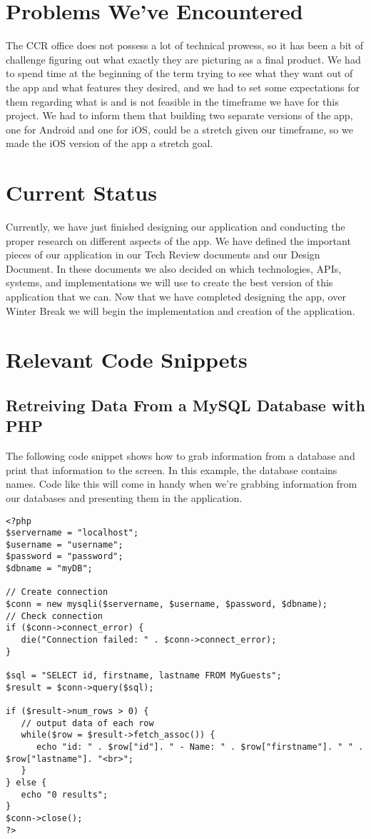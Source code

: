 \documentclass[draftclsnofoot, onecolumn, 10pt, compsoc]{IEEEtran}
\begin{document}
   \section{Problems We've Encountered}
   The CCR office does not possess a lot of technical prowess, so it has been a bit of challenge figuring out what exactly they are picturing as a final product. We had to spend time at the beginning of the term trying to see what they want out of the app and what features they desired, and we had to set some expectations for them regarding what is and is not feasible in the timeframe we have for this project. We had to inform them that building two separate versions of the app, one for Android and one for iOS, could be a stretch given our timeframe, so we made the iOS version of the app a stretch goal.

   \section{Current Status}
   Currently, we have just finished designing our application and conducting the proper research on different aspects of the app. We have defined the important pieces of our application in our Tech Review documents and our Design Document. In these documents we also decided on which technologies, APIs, systems, and implementations we will use to create the best version of this application that we can. Now that we have completed designing the app, over Winter Break we will begin the implementation and creation of the application.

   \section{Relevant Code Snippets}
      \subsection{Retreiving Data From a MySQL Database with PHP}
      The following code snippet shows how to grab information from a database and print that information to the screen. In this example, the database contains names. Code like this will come in handy when we're grabbing information from our databases and presenting them in the application.
      \begin{lstlisting}[style=php]
<?php
$servername = "localhost";
$username = "username";
$password = "password";
$dbname = "myDB";

// Create connection
$conn = new mysqli($servername, $username, $password, $dbname);
// Check connection
if ($conn->connect_error) {
   die("Connection failed: " . $conn->connect_error);
}

$sql = "SELECT id, firstname, lastname FROM MyGuests";
$result = $conn->query($sql);

if ($result->num_rows > 0) {
   // output data of each row
   while($row = $result->fetch_assoc()) {
      echo "id: " . $row["id"]. " - Name: " . $row["firstname"]. " " . $row["lastname"]. "<br>";
   }
} else {
   echo "0 results";
}
$conn->close();
?>
      \end{lstlisting}
      ~\cite{MySQL}
\end{document}
